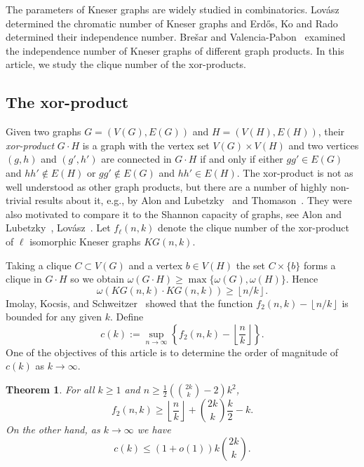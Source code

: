 \documentclass[12pt,a4paper]{amsart}
\numberwithin{equation}{section}
\theoremstyle{plain}
\newtheorem{Th}{Theorem}[section]
\theoremstyle{definition}
\newcommand{\trivup}{\left\lfloor\frac{n}{k}\right\rfloor}
\newcommand{\andris}[1]{{\color{magenta}[{ \textbf{Andris:}  #1}]\marginpar{\color{magenta}*}}}
\newcommand{\NN}{n}
\begin{document}
The parameters of Kneser graphs are widely studied in combinatorics. Lovász~\cite{lovasz1978kneser} determined the chromatic number of Kneser graphs and Erdős, Ko and Rado~\cite{zbMATH03162924} determined their independence number.
Brešar and Valencia-Pabon~\cite{BRESAR20191017} examined the independence number of Kneser graphs of different graph products.
In this article, we study the clique number of the xor-products.


\subsection{The xor-product}
Given two graphs $G=(V(G), E(G))$ and $H=(V(H), E(H))$, their {\em xor-product} $G \cdot H$ is a graph with the vertex set $V(G) \times V(H)$ and two vertices $(g,h)$ and $(g',h')$ are connected in $G \cdot H$ if and only if either $gg' \in E(G)$ and $hh' \not\in E(H)$ or $gg' \not\in E(G)$ and $hh' \in E(H)$.
The xor-product is not as well understood as other graph products, but there are a number of highly non-trivial results about it, e.g., by Alon and Lubetzky~\cite{xorproduct} and Thomason~\cite{Thomason1997GraphPA}.
They were also motivated to compare it to the Shannon capacity of graphs, see Alon and Lubetzky~\cite{AL2}, Lov\'asz~\cite{Lovasz_Shannon}.
Let $f_\ell(\NN, k)$ denote the clique number of the xor-product of $\ell$ isomorphic Kneser graphs $KG(\NN,k)$.

Taking a clique $C\subset V(G)$ and a vertex $b\in V(H)$ the set $C\times \{ b\}$ forms a clique in $G\cdot H$ so we obtain $\omega (G\cdot H)\geq \max \{ \omega(G), \omega(H)\}$.
Hence
\begin{equation*}\label{eq111}
\omega\left(KG(\NN,k)\cdot KG(\NN,k) \right) \geq \left\lfloor \NN/k \right\rfloor.
 \end{equation*}
Imolay, Kocsis, and Schweitzer~\cite{imolay2021clique} showed that the function $f_2(\NN,k)- \left\lfloor \NN/k \right\rfloor$ is bounded
 for any given $k$.
Define
$$ c(k):=  \sup_{\NN\to \infty} \left\{f_2(\NN,k)-\trivup\right\}.$$
One of the objectives of this article is to determine the order of magnitude of $c(k)$ as $k \to \infty$.

\begin{Th} \label{maintheorem}
For all $k \geq 1$ and $\NN\geq \frac{1}{2}\left(\binom{2k}{k}-2\right) k^2$,
\begin{equation}\label{eq11}
  f_2(\NN,k) \geq \trivup+\binom{2k}{k}\frac{k}{2}-k.
\end{equation}
On the other hand, as $k\to \infty$ we have
\begin{equation}\label{eq12}
  c(k) \leq (1+o(1))k\binom{2k}{k}.
\end{equation}
\end{Th}
\end{document}
